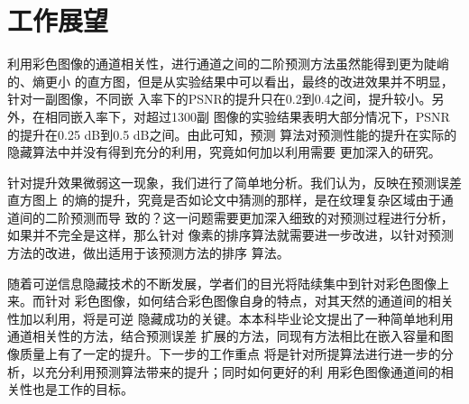 \section{工作展望}
利用彩色图像的通道相关性，进行通道之间的二阶预测方法虽然能得到更为陡峭的、熵更小
的直方图，但是从实验结果中可以看出，最终的改进效果并不明显，针对一副图像，不同嵌
入率下的PSNR的提升只在0.2到0.4之间，提升较小。另外，在相同嵌入率下，对超过1300副
图像的实验结果表明大部分情况下，PSNR的提升在0.25 dB到0.5 dB之间。由此可知，预测
算法对预测性能的提升在实际的隐藏算法中并没有得到充分的利用，究竟如何加以利用需要
更加深入的研究。
\par
针对提升效果微弱这一现象，我们进行了简单地分析。我们认为，反映在预测误差直方图上
的熵的提升，究竟是否如论文中猜测的那样，是在纹理复杂区域由于通道间的二阶预测而导
致的？这一问题需要更加深入细致的对预测过程进行分析，如果并不完全是这样，那么针对
像素的排序算法就需要进一步改进，以针对预测方法的改进，做出适用于该预测方法的排序
算法。
\par
随着可逆信息隐藏技术的不断发展，学者们的目光将陆续集中到针对彩色图像上来。而针对
彩色图像，如何结合彩色图像自身的特点，对其天然的通道间的相关性加以利用，将是可逆
隐藏成功的关键。本本科毕业论文提出了一种简单地利用通道相关性的方法，结合预测误差
扩展的方法，同现有方法相比在嵌入容量和图像质量上有了一定的提升。下一步的工作重点
将是针对所提算法进行进一步的分析，以充分利用预测算法带来的提升；同时如何更好的利
用彩色图像通道间的相关性也是工作的目标。
